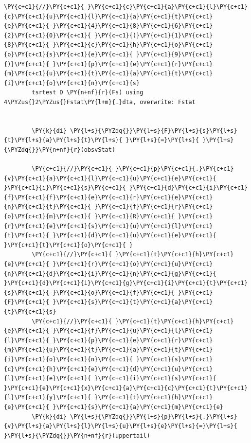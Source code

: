 \documentclass[11pt,notitlepage]{article}\usepackage[]{graphicx}\usepackage[]{color}
\makeatletter
\newenvironment{kframe}{%
 \def\at@end@of@kframe{}%
 \ifinner\ifhmode%
  \def\at@end@of@kframe{\end{minipage}}%
  \begin{minipage}{\columnwidth}%
 \fi\fi%
 \def\FrameCommand##1{\hskip\@totalleftmargin \hskip-\fboxsep
 \colorbox{shadecolor}{##1}\hskip-\fboxsep
     \hskip-\linewidth \hskip-\@totalleftmargin \hskip\columnwidth}%
 \MakeFramed {\advance\hsize-\width
   \@totalleftmargin\z@ \linewidth\hsize
   \@setminipage}}%
 {\par\unskip\endMakeFramed%
 \at@end@of@kframe}
\newenvironment{knitrout}{}{} %
\makeatother
\begin{document}
\begin{enumerate}[a)]
\begin{knitrout}
\begin{kframe}
\begin{Verbatim}[commandchars=\\\{\}]
        \PY{c+c1}{//}\PY{c+c1}{ }\PY{c+c1}{c}\PY{c+c1}{a}\PY{c+c1}{l}\PY{c+c1}{c}\PY{c+c1}{u}\PY{c+c1}{l}\PY{c+c1}{a}\PY{c+c1}{t}\PY{c+c1}{e}\PY{c+c1}{ }\PY{c+c1}{4}\PY{c+c1}{8}\PY{c+c1}{6}\PY{c+c1}{2}\PY{c+c1}{0}\PY{c+c1}{ }\PY{c+c1}{(}\PY{c+c1}{1}\PY{c+c1}{8}\PY{c+c1}{ }\PY{c+c1}{c}\PY{c+c1}{h}\PY{c+c1}{o}\PY{c+c1}{o}\PY{c+c1}{s}\PY{c+c1}{e}\PY{c+c1}{ }\PY{c+c1}{9}\PY{c+c1}{)}\PY{c+c1}{ }\PY{c+c1}{p}\PY{c+c1}{e}\PY{c+c1}{r}\PY{c+c1}{m}\PY{c+c1}{u}\PY{c+c1}{t}\PY{c+c1}{a}\PY{c+c1}{t}\PY{c+c1}{i}\PY{c+c1}{o}\PY{c+c1}{n}\PY{c+c1}{s}
        tsrtest D \PY{n+nf}{r}(Fs) using 4\PYZus{}2\PYZus{}Fstat\PY{l+m}{.}dta, overwrite: Fstat
        
        
        \PY{k}{di} \PY{l+s}{\PYZdq{}}\PY{l+s}{F}\PY{l+s}{s}\PY{l+s}{t}\PY{l+s}{a}\PY{l+s}{t}\PY{l+s}{ }\PY{l+s}{=}\PY{l+s}{ }\PY{l+s}{\PYZdq{}}\PY{n+nf}{r}(obsvStat)
        
        \PY{c+c1}{//}\PY{c+c1}{ }\PY{c+c1}{p}\PY{c+c1}{.}\PY{c+c1}{v}\PY{c+c1}{a}\PY{c+c1}{l}\PY{c+c1}{u}\PY{c+c1}{e}\PY{c+c1}{ }\PY{c+c1}{i}\PY{c+c1}{s}\PY{c+c1}{ }\PY{c+c1}{d}\PY{c+c1}{i}\PY{c+c1}{f}\PY{c+c1}{f}\PY{c+c1}{e}\PY{c+c1}{r}\PY{c+c1}{e}\PY{c+c1}{n}\PY{c+c1}{t}\PY{c+c1}{ }\PY{c+c1}{f}\PY{c+c1}{r}\PY{c+c1}{o}\PY{c+c1}{m}\PY{c+c1}{ }\PY{c+c1}{R}\PY{c+c1}{ }\PY{c+c1}{r}\PY{c+c1}{e}\PY{c+c1}{s}\PY{c+c1}{u}\PY{c+c1}{l}\PY{c+c1}{t}\PY{c+c1}{ }\PY{c+c1}{d}\PY{c+c1}{u}\PY{c+c1}{e}\PY{c+c1}{ }\PY{c+c1}{t}\PY{c+c1}{o}\PY{c+c1}{ }
        \PY{c+c1}{//}\PY{c+c1}{ }\PY{c+c1}{t}\PY{c+c1}{h}\PY{c+c1}{e}\PY{c+c1}{ }\PY{c+c1}{r}\PY{c+c1}{o}\PY{c+c1}{u}\PY{c+c1}{n}\PY{c+c1}{d}\PY{c+c1}{i}\PY{c+c1}{n}\PY{c+c1}{g}\PY{c+c1}{ }\PY{c+c1}{d}\PY{c+c1}{i}\PY{c+c1}{g}\PY{c+c1}{i}\PY{c+c1}{t}\PY{c+c1}{s}\PY{c+c1}{ }\PY{c+c1}{o}\PY{c+c1}{f}\PY{c+c1}{ }\PY{c+c1}{F}\PY{c+c1}{ }\PY{c+c1}{s}\PY{c+c1}{t}\PY{c+c1}{a}\PY{c+c1}{t}\PY{c+c1}{s}
        \PY{c+c1}{//}\PY{c+c1}{ }\PY{c+c1}{t}\PY{c+c1}{h}\PY{c+c1}{e}\PY{c+c1}{ }\PY{c+c1}{f}\PY{c+c1}{u}\PY{c+c1}{l}\PY{c+c1}{l}\PY{c+c1}{ }\PY{c+c1}{p}\PY{c+c1}{e}\PY{c+c1}{r}\PY{c+c1}{m}\PY{c+c1}{u}\PY{c+c1}{t}\PY{c+c1}{a}\PY{c+c1}{t}\PY{c+c1}{i}\PY{c+c1}{o}\PY{c+c1}{n}\PY{c+c1}{ }\PY{c+c1}{s}\PY{c+c1}{c}\PY{c+c1}{h}\PY{c+c1}{e}\PY{c+c1}{d}\PY{c+c1}{u}\PY{c+c1}{l}\PY{c+c1}{e}\PY{c+c1}{ }\PY{c+c1}{i}\PY{c+c1}{s}\PY{c+c1}{ }\PY{c+c1}{e}\PY{c+c1}{x}\PY{c+c1}{a}\PY{c+c1}{c}\PY{c+c1}{t}\PY{c+c1}{l}\PY{c+c1}{y}\PY{c+c1}{ }\PY{c+c1}{t}\PY{c+c1}{h}\PY{c+c1}{e}\PY{c+c1}{ }\PY{c+c1}{s}\PY{c+c1}{a}\PY{c+c1}{m}\PY{c+c1}{e}
        \PY{k}{di} \PY{l+s}{\PYZdq{}}\PY{l+s}{p}\PY{l+s}{.}\PY{l+s}{v}\PY{l+s}{a}\PY{l+s}{l}\PY{l+s}{u}\PY{l+s}{e}\PY{l+s}{=}\PY{l+s}{ }\PY{l+s}{\PYZdq{}}\PY{n+nf}{r}(uppertail)
\end{Verbatim}


\end{kframe}
\end{knitrout}
\end{enumerate}
\end{document}

